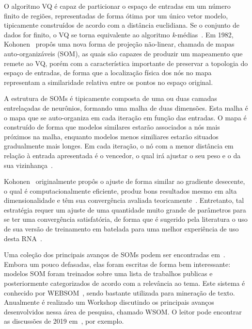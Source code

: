 \documentclass[conference]{IEEEtran}
\begin{document}
	O algoritmo VQ é capaz de particionar o espaço de entradas em um número finito de regiões, representadas de forma ótima por um único vetor modelo, tipicamente construídos de acordo com a distância euclidiana. Se o conjunto de dados for finito, o VQ se torna equivalente ao algoritmo \textit{k}-médias~\cite{kohonen2013essentials}. Em 1982, Kohonen~\cite{kohonen1982self} propôs uma nova forma de projeção não-linear, chamada de mapas auto-organizáveis (SOM), as quais são capazes de produzir um mapeamento que remete ao VQ, porém com a característica importante de preservar a topologia do espaço de entradas, de forma que a localização física dos nós no mapa representam a similaridade relativa entre os pontos no espaço original.
	
	A estrutura de SOMs é tipicamente composta de uma ou duas camadas entrelaçadas de neurônios, formando uma malha de duas dimensões. Esta malha é o mapa que se auto-organiza em cada iteração em função das entradas. O mapa é construído de forma que modelos similares estarão associados a nós mais próximos na malha, enquanto modelos menos similiares estarão situados gradualmente mais longes. Em cada iteração, o nó com a menor distância em relação à entrada apresentada é o vencedor, o qual irá ajustar o seu peso e o da sua vizinhança~\cite{kiang2001extending}. 
	
	Kohonen~\cite{kohonen1982self} originalmente propôs o ajuste de forma similar ao gradiente desecente, o qual é computacionalmente eficiente, produz bons resultados mesmo em alta dimensionalidade e têm sua convergência avaliada teoricamente~\cite{cottrell1998theoretical}. Entretanto, tal estratégia requer um ajuste de uma quantidade muito grande de parâmetros para se ter uma convergência satisfatória, de forma que é sugerido pela literatura o uso de sua versão de treinamento em batelada para uma melhor experiência de uso desta RNA~\cite{kohonen2013essentials}.
	
	Uma coleção dos principais avanços de SOMs podem ser encontradas em~\cite{kaski1998bibliography, oja2003bibliography, polla2009bibliography}. Embora um pouco defasadas, elas foram escritas de forma bem interessante: modelos SOM foram treinados sobre uma lista de trabalhos publicas e posteriormente categorizados de acordo com a relevância ao tema. Este sistema é conhecido por WEBSOM~\cite{kaski1998websom}, sendo bastante utilizada para mineração de texto. Anualmente é realizado um Workshop discutindo os principais avanços desenvolvidos nessa área de pesquisa, chamado WSOM. O leitor pode encontrar as discussões de 2019 em~\cite{vellido2019advances}, por exemplo. 
	
\end{document}
